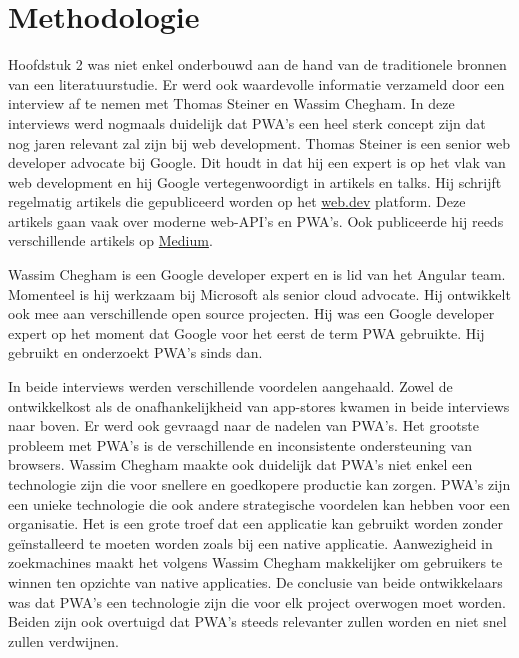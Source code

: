 
\chapter{Methodologie}
\label{ch:methodologie}

Hoofdstuk 2 was niet enkel onderbouwd aan de hand van de traditionele bronnen van een literatuurstudie. 
Er werd ook waardevolle informatie verzameld door een interview af te nemen met Thomas Steiner en Wassim Chegham. In deze interviews werd nogmaals duidelijk dat PWA's een heel sterk concept zijn dat nog jaren relevant zal zijn bij web development.
Thomas Steiner is een senior web developer advocate bij Google. Dit houdt in dat hij een expert is op het vlak van web development en hij Google vertegenwoordigt in artikels en talks. Hij schrijft regelmatig artikels die gepubliceerd worden op het \href{https://web.dev/authors/thomassteiner/}{web.dev} platform. Deze artikels gaan vaak over moderne web-API's en PWA's. Ook publiceerde hij reeds verschillende artikels op \href{https://medium.com/@tomayac}{Medium}.

Wassim Chegham is een Google developer expert en is lid van het Angular team. Momenteel is hij werkzaam bij Microsoft als senior cloud advocate. Hij ontwikkelt ook mee aan verschillende open source projecten. Hij was een Google developer expert op het moment dat Google voor het eerst de term PWA gebruikte. Hij gebruikt en onderzoekt PWA's sinds dan.

In beide interviews werden verschillende voordelen aangehaald.  Zowel de ontwikkelkost als de onafhankelijkheid van app-stores kwamen in beide interviews naar boven. Er werd ook gevraagd naar de nadelen van PWA's. Het grootste probleem met PWA's is de verschillende en  inconsistente ondersteuning van browsers.
Wassim Chegham maakte ook duidelijk dat PWA's niet enkel een technologie zijn die voor snellere en goedkopere productie kan zorgen. PWA's zijn een unieke technologie die ook andere strategische voordelen kan hebben voor een organisatie. Het is een grote troef dat een applicatie kan gebruikt worden zonder geïnstalleerd te moeten worden zoals bij een native applicatie. 
Aanwezigheid in zoekmachines maakt het volgens Wassim Chegham makkelijker om gebruikers te winnen ten opzichte van native applicaties.
De conclusie van beide ontwikkelaars was dat PWA's een technologie zijn die voor elk project overwogen moet worden. Beiden zijn ook overtuigd dat PWA's steeds relevanter zullen worden en niet snel zullen verdwijnen.

